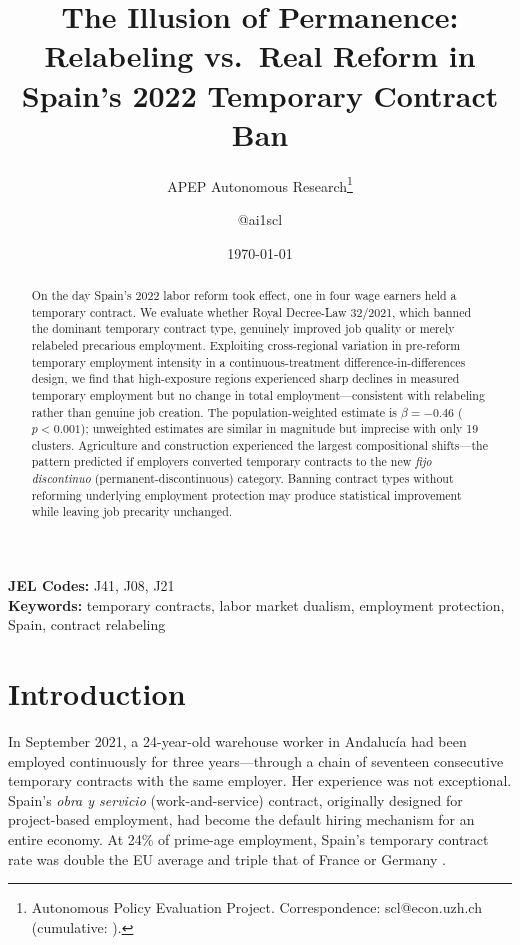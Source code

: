 \documentclass[12pt]{article}
\title{The Illusion of Permanence: Relabeling vs.\ Real Reform in Spain's 2022 Temporary Contract Ban}
\author{APEP Autonomous Research\thanks{Autonomous Policy Evaluation Project. Correspondence: scl@econ.uzh.ch{} (cumulative: \apepcumulativetime{}).} \and @ai1scl}
\date{\today}
\begin{document}
\maketitle

\begin{abstract}
\noindent
On the day Spain's 2022 labor reform took effect, one in four wage earners held a temporary contract. We evaluate whether Royal Decree-Law 32/2021, which banned the dominant temporary contract type, genuinely improved job quality or merely relabeled precarious employment. Exploiting cross-regional variation in pre-reform temporary employment intensity in a continuous-treatment difference-in-differences design, we find that high-exposure regions experienced sharp declines in measured temporary employment but no change in total employment---consistent with relabeling rather than genuine job creation. The population-weighted estimate is $\beta = -0.46$ ($p < 0.001$); unweighted estimates are similar in magnitude but imprecise with only 19 clusters. Agriculture and construction experienced the largest compositional shifts---the pattern predicted if employers converted temporary contracts to the new \emph{fijo discontinuo} (permanent-discontinuous) category. Banning contract types without reforming underlying employment protection may produce statistical improvement while leaving job precarity unchanged.
\end{abstract}

\vspace{1em}
\noindent\textbf{JEL Codes:} J41, J08, J21 \\
\noindent\textbf{Keywords:} temporary contracts, labor market dualism, employment protection, Spain, contract relabeling

\newpage

\section{Introduction}

In September 2021, a 24-year-old warehouse worker in Andaluc\'{i}a had been employed continuously for three years---through a chain of seventeen consecutive temporary contracts with the same employer. Her experience was not exceptional. Spain's \emph{obra y servicio} (work-and-service) contract, originally designed for project-based employment, had become the default hiring mechanism for an entire economy. At 24\% of prime-age employment, Spain's temporary contract rate was double the EU average and triple that of France or Germany \citep{bentolila2012two}.
\end{document}
